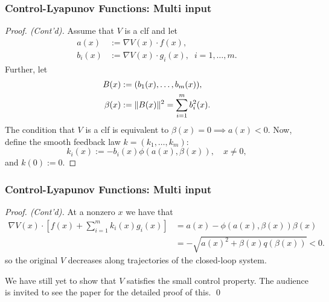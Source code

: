 \begin{frame}
    \frametitle{Control-Lyapunov Functions: Multi input}

    \begin{proof}[Proof. (Cont'd)]
        Assume that $V$ is a clf and let 
        \begin{align*}
            a(x) &:= \nabla V(x) \cdot f(x), \\
            b_i(x) &:= \nabla V(x) \cdot g_i(x), \;\; i=1,\ldots,m.
        \end{align*}
        Further, let
        \begin{align*}
            B(x) &:= (b_1(x), \ldots, b_m(x)), \\
            \beta(x) &:= \|{B(x)}\|_{{}_{}}^2 = \sum_{i=1}^m b_i^2(x).
        \end{align*}
        The condition that $V$ is a clf is equivalent to $\beta(x) = 0 \implies
        a(x) < 0$. Now, define the smooth feedback law $k = (k_1, \ldots, k_m)$: \[
        k_i(x) := -b_i(x)\phi(a(x), \beta(x)), \quad x \neq 0, \] and $k(0) :=
        0$.
    \end{proof}
\end{frame}

\begin{frame}
    \frametitle{Control-Lyapunov Functions: Multi input}

    \begin{proof}[Proof. (Cont'd)]
        At a nonzero $x$ we have that 
        \begin{align*}
            \nabla V(x) \cdot \left[ f(x) + \sum_{i=1}^m k_i(x)g_i(x) \right]
            &= a(x) - \phi\left( a(x), \beta(x) \right)\beta(x) \\
            &= -\sqrt{a(x)^2 + \beta(x)q\left( \beta(x) \right)} < 0.
        \end{align*}
        so the original $V$ decreases along trajectories of the closed-loop
        system.

        We have still yet to show that $V$ satisfies the small control property.
        The audience is invited to see the paper for the detailed proof of this.
        \hfill \qed
    \end{proof}
\end{frame}


\endgroup